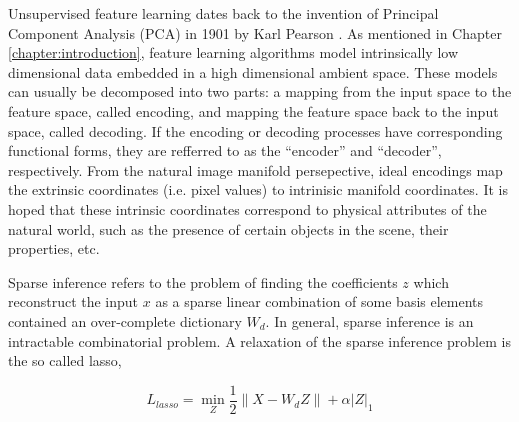 Unsupervised feature learning dates back to the invention of Principal
Component Analysis (PCA) in 1901 by Karl Pearson \cite{PCA}. As mentioned in
Chapter \ref{chapter:introduction}, feature learning algorithms model
intrinsically low dimensional data embedded in a high dimensional ambient
space. These models can usually be decomposed into two parts: a mapping from
the input space to the feature space, called encoding, and
mapping the feature space back to the input space, called decoding. If the encoding 
or decoding processes have corresponding functional forms, they are 
refferred to as the ``encoder'' and ``decoder'', respectively.  From the
natural image manifold persepective, ideal encodings map the extrinsic
coordinates (i.e. pixel values) to intrinisic manifold coordinates. It is hoped
that these intrinsic coordinates correspond to physical attributes of the
natural world, such as the presence of certain objects in the scene, their
properties, etc. \cite{nair2008,capsules}     

Sparse inference refers to the problem of finding the coefficients $z$ which
reconstruct the input $x$ as a sparse linear combination of some basis elements
contained an over-complete dictionary $W_d$. In general, sparse inference is an 
intractable combinatorial problem. A relaxation of the sparse inference problem is
the so called lasso, 

\begin{equation}
L_{lasso} = \min_Z \frac{1}{2}\|X-W_dZ\| + \alpha |Z|_1 
\end{equation} 

 
